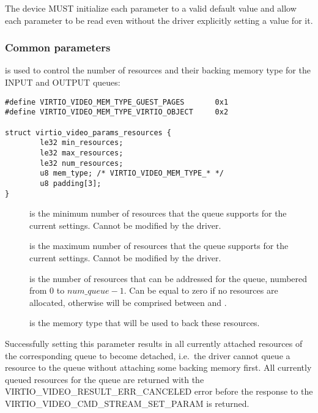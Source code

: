 
The device MUST initialize each parameter to a valid default value and
allow each parameter to be read even without the driver explicitly
setting a value for it.

\subsubsection{Common parameters}\label{sec:Device Types / Video Device / Parameters / Common parameters}

 is used to control the
number of resources and their backing memory type for the INPUT and
OUTPUT queues:

\begin{lstlisting}
#define VIRTIO_VIDEO_MEM_TYPE_GUEST_PAGES       0x1
#define VIRTIO_VIDEO_MEM_TYPE_VIRTIO_OBJECT     0x2

struct virtio_video_params_resources {
        le32 min_resources;
        le32 max_resources;
        le32 num_resources;
        u8 mem_type; /* VIRTIO_VIDEO_MEM_TYPE_* */
        u8 padding[3];
}
\end{lstlisting}

\begin{description}
\item[]
is the minimum number of resources that the queue supports for the
current settings. Cannot be modified by the driver.
\item[]
is the maximum number of resources that the queue supports for the
current settings. Cannot be modified by the driver.
\item[]
is the number of resources that can be addressed for the queue, numbered
from \(0\) to \(num\_queue - 1\). Can be equal to zero if no resources
are allocated, otherwise will be comprised between 
and .
\item[]
is the memory type that will be used to back these resources.
\end{description}

Successfully setting this parameter results in all currently attached
resources of the corresponding queue to become detached, i.e.~the driver
cannot queue a resource to the queue without attaching some backing
memory first. All currently queued resources for the queue are returned
with the VIRTIO\_VIDEO\_RESULT\_ERR\_CANCELED error before the response
to the VIRTIO\_VIDEO\_CMD\_STREAM\_SET\_PARAM is returned.

